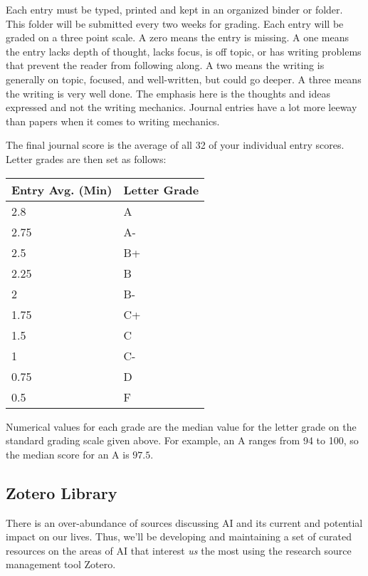\documentclass[]{tufte-handout}
\begin{document}
Each entry must be typed, printed and kept in an organized binder or folder.  This folder will be submitted every two weeks for grading. Each entry will be graded on a three point scale. A zero means the entry is missing. A one means the entry lacks depth of thought, lacks focus, is off topic, or has writing problems that prevent the reader from following along. A two means the writing is generally on topic, focused, and well-written, but could go deeper.  A three means the writing is very well done.  The emphasis here is the thoughts and ideas expressed and not the writing mechanics.  Journal entries have a lot more leeway than papers when it comes to writing mechanics. 

The final journal score is the average of all 32 of your individual entry scores.  Letter grades are then set as follows: 

\vspace{.1in}
\begin{center}
\begin{small}
\begin{tabular}{ll}
Entry Avg. (Min) & Letter Grade \\ \hline
2.8   & A  \\
2.75    & A- \\
2.5 & B+ \\
2.25    & B  \\ 
2   & B- \\
1.75    & C+ \\
1.5 & C  \\
1   & C- \\
0.75    & D  \\
0.5  & F 
\end{tabular}
\end{small}
\end{center}
\vspace{.1in}

Numerical values for each grade are the median value for the letter grade on the standard grading scale given above. For example, an A ranges from 94 to 100, so the median score for an A is $97.5$. 

\subsection{Zotero Library}

There is an over-abundance of sources discussing AI and its current and potential impact on our lives. Thus, we'll be developing and maintaining a set of curated resources on the areas of AI that interest \textit{us} the most using the research source management tool Zotero.  
\end{document}
